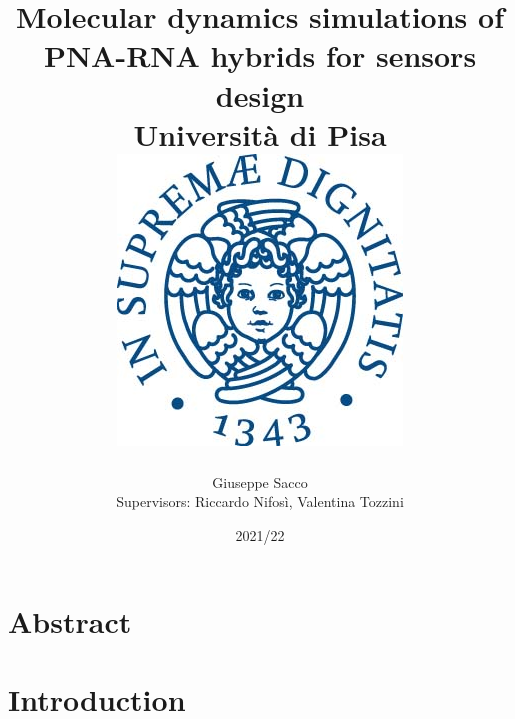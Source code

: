 \documentclass{report}
\title{\textbf{Molecular dynamics simulations of PNA-RNA hybrids for sensors design}\\Università di Pisa\\\includegraphics[width=0.2\linewidth]{Unipi_logo.jpg}}
\author{Giuseppe Sacco\\Supervisors: Riccardo Nifosì, Valentina Tozzini}
\date{2021/22}
\begin{document}
\maketitle

\chapter*{Abstract}

\tableofcontents

\chapter{Introduction}


\printbibliography
\end{document}
